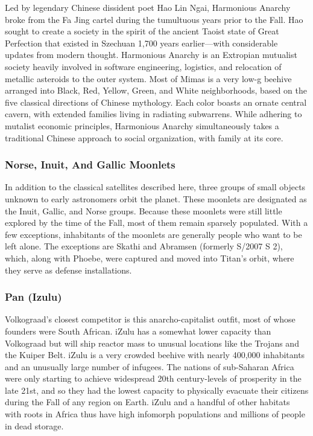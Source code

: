 Led by legendary Chinese dissident poet Hao Lin 
Ngai, Harmonious Anarchy broke from the Fa Jing 
cartel during the tumultuous years prior to the Fall. 
Hao sought to create a society in the spirit of the 
ancient Taoist state of Great Perfection that existed 
in Szechuan 1,700 years earlier—with considerable 
updates from modern thought. Harmonious Anarchy 
is an Extropian mutualist society heavily involved in 
software engineering, logistics, and relocation of metallic asteroids to the outer system. Most of Mimas is 
a very low-g beehive arranged into Black, Red, Yellow, 
Green, and White neighborhoods, based on the five 
classical directions of Chinese mythology. Each color 
boasts an ornate central cavern, with extended families living in radiating subwarrens. While adhering to 
mutalist economic principles, Harmonious Anarchy 
simultaneously takes a traditional Chinese approach 
to social organization, with family at its core.

\subsubsection{Norse, Inuit, And Gallic Moonlets}

In addition to the classical satellites described here, 
three groups of small objects unknown to early 
astronomers orbit the planet. These moonlets are 
designated as the Inuit, Gallic, and Norse groups. 
Because these moonlets were still little explored by 
the time of the Fall, most of them remain sparsely 
populated. With a few exceptions, inhabitants of the 
moonlets are generally people who want to be left 
alone. The exceptions are Skathi and Abramsen (formerly S/2007 S 2), which, along with Phoebe, were 
captured and moved into Titan's orbit, where they 
serve as defense installations.

\subsubsection{Pan (Izulu)}

Volkograad's closest competitor is this anarcho-capitalist outfit, most of whose founders were South 
African. iZulu has a somewhat lower capacity than 
Volkograad but will ship reactor mass to unusual 
locations like the Trojans and the Kuiper Belt. iZulu is 
a very crowded beehive with nearly 400,000 inhabitants and an unusually large number of infugees. The 
nations of sub-Saharan Africa were only starting to 
achieve widespread 20th century-levels of prosperity 
in the late 21st, and so they had the lowest capacity to 
physically evacuate their citizens during the Fall of any 
region on Earth. iZulu and a handful of other habitats 
with roots in Africa thus have high infomorph populations and millions of people in dead storage.

